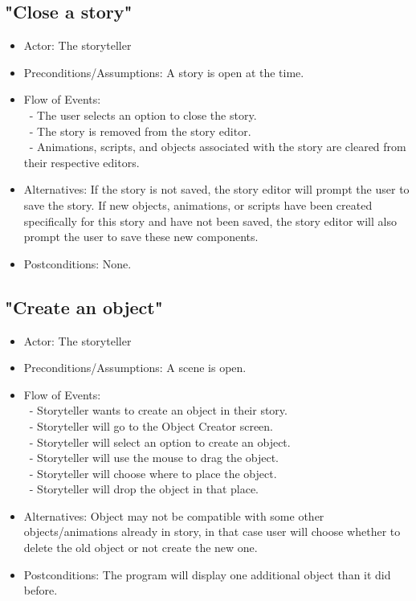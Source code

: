 \documentclass[12pt]{article}
\begin{document}
		\subsection{"Close a story"}
\begin{itemize}
	\item Actor: The storyteller
		\item Preconditions/Assumptions: A story is open at the time.
	\item Flow of Events: \\
	\	- The user selects an option to close the story. \\
	\	- The story is removed from the story editor. \\
	\	- Animations, scripts, and objects associated with the story are cleared from their respective editors.
	\item Alternatives: If the story is not saved, the story editor will prompt the user to
	save the story. If new objects, animations, or scripts have been created specifically for this
	story and have not been saved, the story editor will also prompt the user to save these
	new components.
	\item Postconditions: None.
\end{itemize}
	
	\subsection{"Create an object"}
\begin{itemize}
	\item Actor: The storyteller
	\item Preconditions/Assumptions: A scene is open. 
	\item Flow of Events: \\
	 	\ - Storyteller wants to create an object in their story. \\
	 	\ - Storyteller will go to the Object Creator screen. \\
		\ - Storyteller will select an option to create an object. \\
		\ - Storyteller will use the mouse to drag the object. \\
		\ - Storyteller will choose where to place the object. \\
		\ - Storyteller will drop the object in that place.
	\item Alternatives: Object may not be compatible with some other objects/animations already in story, in that case user will choose whether to delete the old object or not create the new one.
	\item Postconditions: The program will display one additional object than it did before.
\end{itemize}
\end{document}
